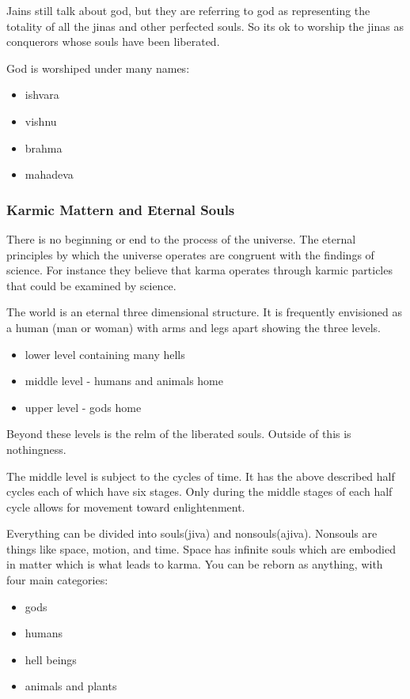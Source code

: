 \documentclass{article}
\begin{document}
Jains still talk about god, but they are referring to god as representing the totality of all the jinas and other perfected souls. So its ok to worship the jinas as conquerors whose souls have been liberated.

God is worshiped under many names:
\begin{itemize}
	\item ishvara
	\item vishnu
	\item brahma
	\item mahadeva
\end{itemize}

\subsubsection{Karmic Mattern and Eternal Souls}
\label{ssub:karmic_mattern_and_eternal_souls}
There is no beginning or end to the process of the universe. The eternal principles by which the universe operates are congruent with the findings of science. For instance they believe that karma operates through karmic particles that could be examined by science.

The world is an eternal three dimensional structure. It is frequently envisioned as a human (man or woman) with arms and legs apart showing the three levels.
\begin{itemize}
	\item lower level containing many hells
	\item middle level - humans and animals home
	\item upper level - gods home
\end{itemize}
Beyond these levels is the relm of the liberated souls. Outside of this is nothingness.

The middle level is subject to the cycles of time. It has the above described half cycles each of which have six stages. Only during the middle stages of each half cycle allows for movement toward enlightenment.

Everything can be divided into souls(jiva) and nonsouls(ajiva). Nonsouls are things like space, motion, and time. Space has infinite souls which are embodied in matter which is what leads to karma. You can be reborn as anything, with four main categories:
\begin{itemize}
	\item gods
	\item humans
	\item hell beings
	\item animals and plants
\end{itemize}
\end{document}
